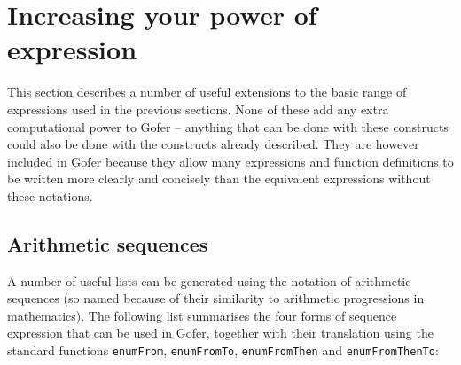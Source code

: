 \chapter{Increasing your power of expression}
 
This section describes a number of useful extensions to the basic range
of expressions used in the previous sections.  None of  these  add  any
extra computational power to Gofer -- anything that can  be  done  with
these constructs  could  also  be  done  with  the  constructs  already
described.  They are however included in Gofer because they allow  many
expressions and function definitions to be  written  more  clearly  and
concisely than the equivalent expressions without these notations.

\section{Arithmetic sequences}
A number of useful  lists  can  be  generated  using  the  notation  of
arithmetic  sequences  (so  named  because  of  their   similarity   to
arithmetic progressions in mathematics).  The following list summarises
the four forms of sequence  expression  that  can  be  used  in  Gofer,
together with their translation using the standard functions  \verb"enumFrom",
\verb"enumFromTo", \verb"enumFromThen" and \verb"enumFromThenTo":
\BQ
